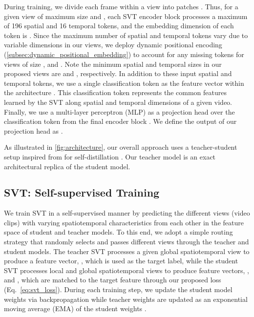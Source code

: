 \documentclass[10pt,twocolumn,letterpaper]{article}
\begin{document}
During training, we divide each frame within a view into patches \cite{dosovitskiy2020image}. 
Thus, for a given view of maximum size  and , each SVT encoder block processes a maximum of 196 spatial and 16 temporal tokens, and the embedding dimension of each token is  \cite{dosovitskiy2020image}. 
Since the maximum number of spatial and temporal tokens vary due to variable dimensions in our views, we deploy {dynamic positional encoding (\cref{subsec:dynamic_positional_embedding})} to account for any missing tokens for views of size ,  and . Note the minimum spatial and temporal sizes in our proposed views are  and , respectively.
In addition to these input spatial and temporal tokens, we use a single classification token as the feature vector within the architecture \cite{devlin2018bert, dosovitskiy2020image}. This classification token represents the common features learned by the SVT along spatial and temporal dimensions of a given video. Finally, we use a multi-layer perceptron (MLP) as a projection head over the classification token from the final encoder block \cite{caron2021emerging, grill2020bootstrap}. We define the output of our projection head as . 

As illustrated in \cref{fig:architecture}, our overall approach uses a teacher-student setup inspired from \cite{caron2021emerging, grill2020bootstrap} for self-distillation \cite{tarvainen2017mean}. 
Our teacher model is an exact architectural replica of the student model.


\subsection{SVT: Self-supervised Training}
\label{subsec:training}

We train SVT in a self-supervised manner by predicting the different views (video clips) with varying spatiotemporal characteristics from each other in the feature space of student and teacher models. To this end, we adopt a simple routing strategy that randomly selects and passes different views through the teacher and student models. The teacher SVT processes a given global spatiotemporal view to produce a feature vector, , which is used as the target label, while the student SVT processes local and global spatiotemporal views to produce feature vectors, , and , which are matched to the target feature  through our proposed loss (Eq.~\ref{eq:svt_loss}). During each training step, we update the student model weights via backpropagation while teacher weights are updated as an exponential moving average (EMA) of the student weights \cite{caron2021emerging}. 
\end{document}
